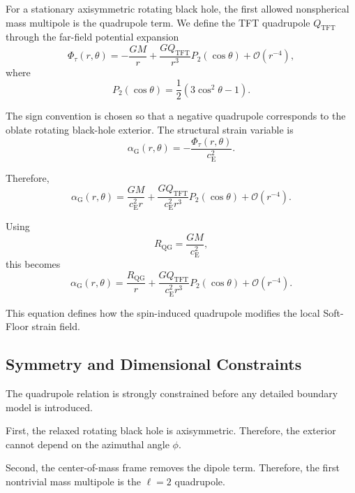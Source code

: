 For a stationary axisymmetric rotating black hole, the first allowed nonspherical mass multipole is the quadrupole term. We define the TFT quadrupole $Q_{\mathrm{TFT}}$ through the far-field potential expansion
\begin{equation}
    \Phi_{\tau}(r,\theta) = -\frac{GM}{r} + \frac{GQ_{\mathrm{TFT}}}{r^3} P_2(\cos\theta) + \mathcal{O}(r^{-4}),
\end{equation}
where
\begin{equation}
    P_2(\cos\theta) = \frac{1}{2} \left( 3\cos^2\theta-1 \right).
\end{equation}

The sign convention is chosen so that a negative quadrupole corresponds to the oblate rotating black-hole exterior. The structural strain variable is
\begin{equation}
    \alpha_{\mathrm{G}}(r,\theta) = -\frac{\Phi_{\tau}(r,\theta)}{c_{\mathrm{E}}^2}.
\end{equation}

Therefore,
\begin{equation}
    \alpha_{\mathrm{G}}(r,\theta) = \frac{GM}{c_{\mathrm{E}}^2r} + \frac{GQ_{\mathrm{TFT}}}{c_{\mathrm{E}}^2r^3} P_2(\cos\theta) + \mathcal{O}(r^{-4}).
\end{equation}

Using
\begin{equation}
    R_{\mathrm{QG}} = \frac{GM}{c_{\mathrm{E}}^2},
\end{equation}
this becomes
\begin{equation}
    \alpha_{\mathrm{G}}(r,\theta) = \frac{R_{\mathrm{QG}}}{r} + \frac{GQ_{\mathrm{TFT}}}{c_{\mathrm{E}}^2r^3} P_2(\cos\theta) + \mathcal{O}(r^{-4}).
\end{equation}

This equation defines how the spin-induced quadrupole modifies the local Soft-Floor strain field.

\subsection{Symmetry and Dimensional Constraints}

The quadrupole relation is strongly constrained before any detailed boundary model is introduced.

First, the relaxed rotating black hole is axisymmetric. Therefore, the exterior cannot depend on the azimuthal angle $\phi$.

Second, the center-of-mass frame removes the dipole term. Therefore, the first nontrivial mass multipole is the $\ell=2$ quadrupole.

